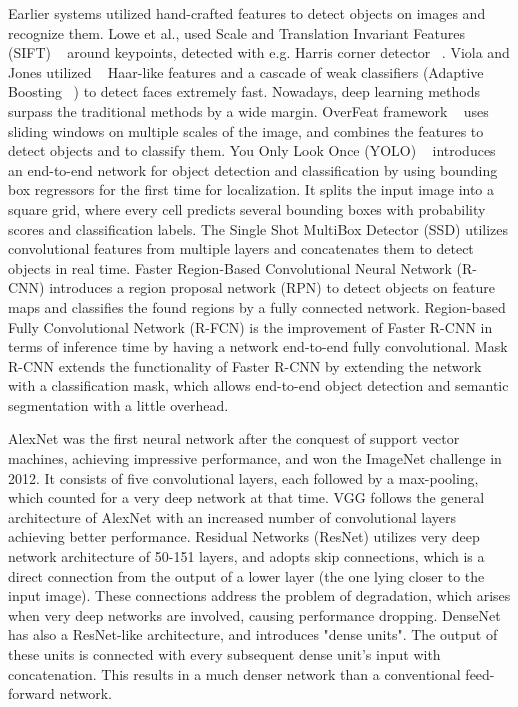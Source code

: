 \documentclass[a4paper,twoside]{article}
\begin{document}
Earlier systems utilized hand-crafted features to detect objects on images and recognize them. Lowe et al., used Scale and Translation Invariant Features (SIFT) ~\cite{lowe2004} around keypoints, detected with e.g. Harris corner detector ~\cite{harris1988}. Viola and Jones utilized ~\cite{viola2004} Haar-like features and a cascade of weak classifiers (Adaptive Boosting ~\cite{schapire1999}) to detect faces extremely fast. Nowadays, deep learning methods surpass the traditional methods by a wide margin. OverFeat framework ~\cite{sermanet2013} uses sliding windows on multiple scales of the image, and combines the features to detect objects and to classify them. You Only Look Once (YOLO) ~\cite{redmon2015} introduces an end-to-end network for object detection and classification by using bounding box regressors for the first time for localization. It splits the input image into a square grid, where every cell predicts several bounding boxes with probability scores and classification labels. The Single Shot MultiBox Detector (SSD) \cite{liu2015} utilizes convolutional features from multiple layers and concatenates them to detect objects in real time. Faster Region-Based Convolutional Neural Network (R-CNN) \cite{ren2015} introduces a region proposal network (RPN) to detect objects on feature maps and classifies the found regions by a fully connected network. Region-based Fully Convolutional Network (R-FCN) \cite{jifengdai2016b} is the improvement of Faster R-CNN in terms of inference time by having a network end-to-end fully convolutional. Mask R-CNN \cite{he2017} extends the functionality of Faster R-CNN by extending the network with a classification mask, which allows end-to-end object detection and semantic segmentation with a little overhead.

AlexNet \cite{krizhevsky2012b} was the first neural network after the conquest of support vector machines, achieving impressive performance, and won the ImageNet challenge \cite{deng2009} in 2012. It consists of five convolutional layers, each followed by a max-pooling, which counted for a very deep network at that time. VGG \cite{simonyan2014} follows the general architecture of AlexNet with an increased number of convolutional layers achieving better performance. Residual Networks (ResNet) \cite{he2015} utilizes very deep network architecture of 50-151 layers, and adopts skip connections, which is a direct connection from the output of a lower layer (the one lying closer to the input image). These connections address the problem of degradation, which arises when very deep networks are involved, causing performance dropping. DenseNet \cite{huang2016} has also a ResNet-like architecture, and introduces "dense units". The output of these units is connected with every subsequent dense unit's input with concatenation. This results in a much denser network than a conventional feed-forward network.
\end{document}
